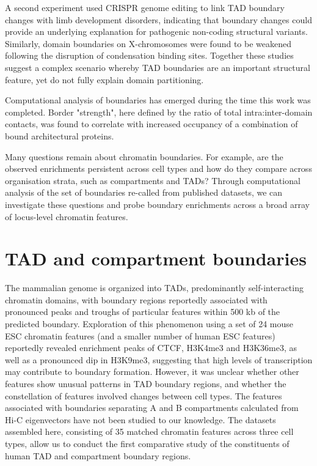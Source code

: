 \documentclass[a4paper,10pt,oneside]{book}
\begin{document}
A second experiment used CRISPR genome editing to link TAD boundary changes with limb development disorders,\cite{Lupianez2015} indicating that boundary changes could provide an underlying explanation for pathogenic non-coding structural variants.\cite{Ren2015} Similarly, domain boundaries on X-chromosomes were found to be weakened following the disruption of condensation binding sites.\cite{Crane2015} Together these studies suggest a complex scenario whereby TAD boundaries are an important structural feature, yet do not fully explain domain partitioning.

Computational analysis of boundaries has emerged during the time this work was completed. Border "strength", here defined by the ratio of total intra:inter-domain contacts, was found to correlate with increased occupancy of a combination of bound architectural proteins.\cite{VanBortle2014}

Many questions remain about chromatin boundaries. For example, are the observed enrichments persistent across cell types and how do they compare across organisation strata, such as compartments and TADs? Through computational analysis of the set of boundaries re-called from published datasets, we can investigate these questions and probe boundary enrichments across a broad array of locus-level chromatin features.

\section{TAD and compartment boundaries}

The mammalian genome is organized into TADs, predominantly self-interacting chromatin domains, with boundary regions reportedly associated with pronounced peaks and troughs of particular features within 500 kb of the predicted boundary.\cite{Dixon2012} Exploration of this phenomenon using a set of 24 mouse ESC chromatin features (and a smaller number of human ESC features) reportedly revealed enrichment peaks of CTCF, H3K4me3 and H3K36me3, as well as a pronounced dip in H3K9me3, suggesting that high levels of transcription may contribute to boundary formation.\cite{Dixon2012} However, it was unclear whether other features show unusual patterns in TAD boundary regions, and whether the constellation of features involved changes between cell types. The features associated with boundaries separating A and B compartments calculated from Hi-C eigenvectors have not been studied to our knowledge. The datasets assembled here, consisting of 35 matched chromatin features across three cell types, allow us to conduct the first comparative study of the constituents of human TAD and compartment boundary regions.
\end{document}
